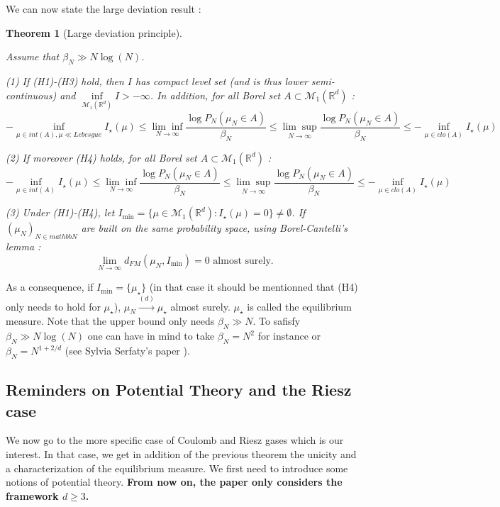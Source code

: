 \documentclass[a4paper,12pt]{report}
\newtheorem{thm}{Theorem}
\begin{document}
We can now state the large deviation result :

\begin{thm}[Large deviation principle]\label{cgz:ldp}

    Assume that $\beta_{N} \gg N\log(N)$.
    
    (1) If (H1)-(H3) hold, then $I$ has compact level set (and is thus lower semi-continuous) and $\underset{\mathcal{M}_{1}(\mathbb{R}^{d})}{\inf} I > - \infty$. In addition, for all Borel set $A \subset \mathcal{M}_{1}(\mathbb{R}^{d})$ : 
    \[-\underset{\mu \in int(A), \mu \ll Lebesgue}{\inf} I_{\star}(\mu) \leq \underset{N \longrightarrow\infty}{\lim \inf} \frac{\log P_{N}(\mu_{N} \in A)}{\beta_{N}}\leq \underset{N \longrightarrow\infty}{\lim \sup} \frac{\log P_{N}(\mu_{N} \in A)}{\beta_{N}} \leq -\underset{\mu \in clo(A)}{\inf} I_{\star}(\mu)\]
    
    (2) If moreover (H4) holds, for all Borel set $A \subset \mathcal{M}_{1}(\mathbb{R}^{d})$ : 
    \[-\underset{\mu \in int(A)}{\inf} I_{\star}(\mu) \leq \underset{N \longrightarrow\infty}{\lim \inf} \frac{\log P_{N}(\mu_{N} \in A)}{\beta_{N}}\leq \underset{N \longrightarrow\infty}{\lim \sup} \frac{\log P_{N}(\mu_{N} \in A)}{\beta_{N}} \leq -\underset{\mu \in clo(A)}{\inf} I_{\star}(\mu)\]
    
    (3) Under (H1)-(H4), let $I_{\min} = \{\mu \in \mathcal{M}_{1}(\mathbb{R}^{d}) : I_{\star}(\mu) = 0\} \neq \emptyset$. If $(\mu_{N})_{N \in mathbb{N}}$ are built on the same probability space, using Borel-Cantelli's lemma :
    \[\underset{N \longrightarrow \infty}{\lim} d_{FM}(\mu_{N}, I_{\min}) = 0 \text{  almost surely.}\]
\end{thm}

As a consequence, if $I_{\min} = \{\mu_{\star}\}$ (in that case it should be mentionned that (H4) only needs to hold for $\mu_{\star}$), $\mu_{N} \overset{(d)}{\longrightarrow} \mu_{\star}$ almost surely. $\mu_{\star}$ is called the equilibrium measure. Note that the upper bound only needs $\beta_{N} \gg N$. To safisfy $\beta_{N} \gg N\log(N)$ one can have in mind to take $\beta_{N} = N^{2}$ for instance or $\beta_{N} = N^{1+2/d}$ (see Sylvia Serfaty's paper \cite{serfaty2020}).


\subsection{Reminders on Potential Theory and the Riesz case}

We now go to the more specific case of Coulomb and Riesz gases which is our interest. In that case, we get in addition of the previous theorem the unicity and a characterization of the equilibrium measure. We first need to introduce some notions of potential theory. \textbf{From now on, the paper only considers the framework $d \geq 3$.}
\end{document}
